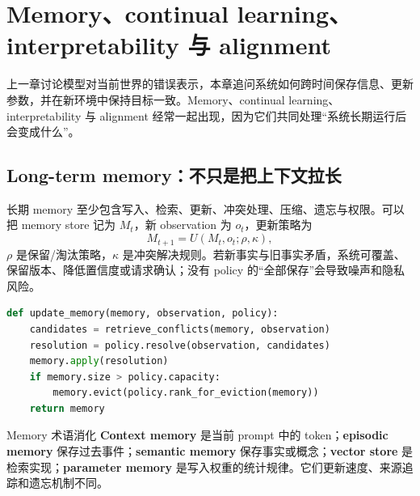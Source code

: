 \section{Memory、continual learning、interpretability 与 alignment}

上一章讨论模型对当前世界的错误表示，本章追问系统如何跨时间保存信息、更新参数，并在新环境中保持目标一致。Memory、continual learning、interpretability 与 alignment 经常一起出现，因为它们共同处理“系统长期运行后会变成什么”。

\subsection{Long-term memory：不只是把上下文拉长}

长期 memory 至少包含写入、检索、更新、冲突处理、压缩、遗忘与权限。可以把 memory store 记为 $M_t$，新 observation 为 $o_t$，更新策略为
\[
M_{t+1}=U(M_t,o_t;\rho,\kappa),
\]
$\rho$ 是保留/淘汰策略，$\kappa$ 是冲突解决规则。若新事实与旧事实矛盾，系统可覆盖、保留版本、降低置信度或请求确认；没有 policy 的“全部保存”会导致噪声和隐私风险。




\begin{lstlisting}[language=Python,caption={带冲突与淘汰策略的 memory update 伪代码}]
def update_memory(memory, observation, policy):
    candidates = retrieve_conflicts(memory, observation)
    resolution = policy.resolve(observation, candidates)
    memory.apply(resolution)
    if memory.size > policy.capacity:
        memory.evict(policy.rank_for_eviction(memory))
    return memory
\end{lstlisting}

\begin{knowledgebox}{Memory 术语消化}
\textbf{Context memory} 是当前 prompt 中的 token；\textbf{episodic memory} 保存过去事件；\textbf{semantic memory} 保存事实或概念；\textbf{vector store} 是检索实现；\textbf{parameter memory} 是写入权重的统计规律。它们更新速度、来源追踪和遗忘机制不同。
\end{knowledgebox}

